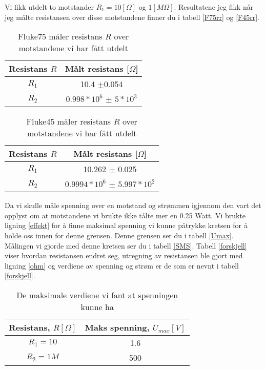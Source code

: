 \documentclass[norsk,a4paper,12pt]{article}
\begin{document}
Vi fikk utdelt to motstander $R_1 = 10[\Omega]$ og $1[M\Omega]$. Resultatene jeg fikk når jeg målte resistansen over disse motstandene finner du i tabell \vref{F75rr} og \vref{F45rr}.\\

\begin{table}[h!]
 	 \centering
 	 \caption[F75 måler resistans over motstand]{Fluke75 måler resistans $R$ over motstandene vi har fått utdelt}
  		\begin{tabular}{|c|c|} \hline
  		\textbf{Resistans $R$} &\textbf{Målt resistans [$\Omega$]} \\ \hline
  		$R_1$ & 10.4 $\pm$0.054 \\ 
		$R_2$ & $0.998 *10^6$ $\pm$ $5*10^{3}$ \\ \hline
  		\end{tabular}
	\label{F75rr}
\end{table}

\begin{table}[h!]
 	 \centering
 	 \caption[F45 måler resistans over motstand]{Fluke45 måler resistans $R$ over motstandene vi har fått utdelt}
  		\begin{tabular}{|c|c|} \hline
  		\textbf{Resistans $R$} &\textbf{Målt resistans [$\Omega$]} \\ \hline
  		$R_1$ & 10.262 $\pm$ 0.025\\ 
		$R_2$ & $0.9994*10^6$ $\pm$ $5.997*10^2$\\ \hline
  		\end{tabular}
	\label{F45rr}
\end{table}

Da vi skulle måle spenning over en motstand og strømmen igjennom den vart det opplyst om at motstandene vi brukte ikke tålte mer en 0.25 Watt. Vi brukte ligning \vref{effekt} for å finne maksimal spenning vi kunne påtrykke kretsen for å holde oss innen for denne grensen. Denne grensen ser du i tabell \vref{Umax}. Målingen vi gjorde med denne kretsen ser du i tabell \vref{SMS}. Tabell \vref{forskjell} viser hvordan resistansen endret seg, utregning av resistansen ble gjort med ligning \vref{ohm} og verdiene av spenning og strøm er de som er nevnt i tabell \ref{forskjell}.
\begin{table}[h!]
 	 \centering
 	 \caption[Maks spenning]{De maksimale verdiene vi fant at spenningen kunne ha}
  		\begin{tabular}{|c|c|} \hline
  		\textbf{Resistans, $R[\Omega]$} &\textbf{Maks spenning, $U_{max}[V]$} \\ \hline
  		$R_1 = 10 $ &  1.6 \\ 
		$R_2 =1 M$ &  500 \\ \hline
  		\end{tabular}
	\label{Umax}
\end{table}
\end{document}
